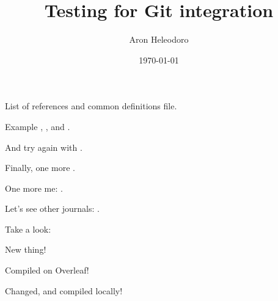 \documentclass{article}
\title{Testing for Git integration}
\author{Aron Heleodoro}
\date{\today}
\begin{document}
\maketitle

List of references and common definitions file.

Example \cite{benjamin_hennion_higher_2017}, \cite{heleodoro_geometry_2018}, \cite{Raskin-D-modules} and \cite{HA}.

And try again with \cite{heleodoro_geometry_2018}.

Finally, one more \cite{elmanto2020nilpotent}.

One more me: \cite{heleodoro2020prestacks}.

Let's see other journals: \cite{AGH}.

Take a look: \cites{shirane2020double,shirane2020arXiv201009243S}

New thing!

Compiled on Overleaf!

Changed, and compiled locally!

% 
% 

\printbibliography
\end{document}
